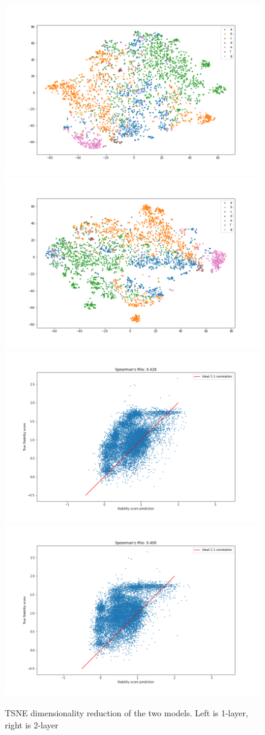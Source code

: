 \begin{figure}[!ht]
  \centering
  \includegraphics[width=0.49\linewidth]{latex/imgs/tsne_1_layer_with_schedule_512_final.png}
  \includegraphics[width=0.49\linewidth]{latex/imgs/tsne_2_layer_no_drop_final.png}
  \includegraphics[width=0.49\linewidth]{latex/imgs/spearman_1_layer_with_schedule_512_final.png}
  \includegraphics[width=0.49\linewidth]{latex/imgs/spearman_2_layer_no_drop_final.png}
  \caption{TSNE dimensionality reduction of the two models. Left is 1-layer, right is 2-layer}
\end{figure}

